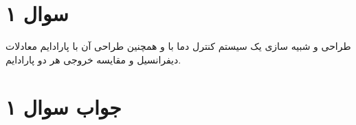 \section*{سوال ۱}

طراحی و شبیه سازی یک سیستم کنترل دما
با
و همچنین طراحی آن با پارادایم معادلات دیفرانسیل و مقایسه خروجی هر دو پارادایم.


\section*{جواب سوال ۱}

